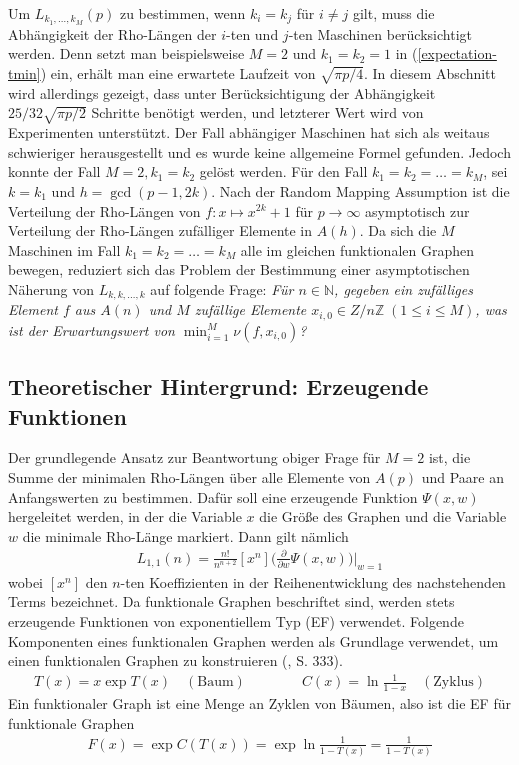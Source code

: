 \documentclass[a4paper, 10pt, ngerman]{article}
\newcommand{\N}{\mathbb{N}}
\newcommand{\Z}{\mathbb{Z}}
\begin{document}
Um $L_{k_1, \dots, k_M}(p)$ zu bestimmen, wenn $k_i = k_j$ für $i \ne j$ gilt, muss die Abhängigkeit der Rho-Längen der $i$-ten und $j$-ten Maschinen berücksichtigt werden. Denn setzt man beispielsweise $M = 2$ und $k_1 = k_2 = 1$ in (\ref{expectation-tmin}) ein, erhält man eine erwartete Laufzeit von $\sqrt {\pi p / 4}$. In diesem Abschnitt wird allerdings gezeigt, dass unter Berücksichtigung der Abhängigkeit $25/32 \sqrt{\pi p / 2}$ Schritte benötigt werden, und letzterer Wert wird von Experimenten unterstützt. Der Fall abhängiger Maschinen hat sich als weitaus schwieriger herausgestellt und es wurde keine allgemeine Formel gefunden. Jedoch konnte der Fall $M = 2, k_1 = k_2$ gelöst werden. Für den Fall $k_1 = k_2 = \dots = k_M$, sei $k = k_1$ und $h = \gcd(p - 1, 2k)$. Nach der Random Mapping Assumption ist die Verteilung der Rho-Längen von $f : x \mapsto x^{2k} + 1$ für $p \to \infty$ asymptotisch zur Verteilung der Rho-Längen zufälliger Elemente in $A(h)$. Da sich die $M$ Maschinen im Fall $k_1 = k_2 = \dots = k_M$ alle im gleichen funktionalen Graphen bewegen, reduziert sich das Problem der Bestimmung einer asymptotischen Näherung von $L_{k, k, \dots, k}$ auf folgende Frage: \emph{Für $n \in \N$, gegeben ein zufälliges Element $f$ aus $A(n)$ und $M$ zufällige Elemente $x_{i, 0} \in Z/n\Z \; (1 \le i \le M)$, was ist der Erwartungswert von $\min_{i = 1}^M \nu(f, x_{i, 0})$?}

\subsection{Theoretischer Hintergrund: Erzeugende Funktionen}

Der grundlegende Ansatz zur Beantwortung obiger Frage für $M = 2$ ist, die Summe der minimalen Rho-Längen über alle Elemente von $A(p)$ und Paare an Anfangswerten zu bestimmen. Dafür soll eine erzeugende Funktion $\Psi(x, w)$ hergeleitet werden, in der die Variable $x$ die Größe des Graphen und die Variable $w$ die minimale Rho-Länge markiert. Dann gilt nämlich
\begin{align*}
    L_{1, 1}(n) = \frac {n!}{n^{n + 2}} [x^n] \Bigg (\frac {\partial} {\partial w} \Psi(x, w) \Bigg ) \Bigg \vert_{w = 1}
\end{align*}
wobei $[x^n]$ den $n$-ten Koeffizienten in der Reihenentwicklung des nachstehenden Terms bezeichnet. Da funktionale Graphen beschriftet sind, werden stets erzeugende Funktionen von exponentiellem Typ (EF) verwendet. Folgende Komponenten eines funktionalen Graphen werden als Grundlage verwendet, um einen funktionalen Graphen zu konstruieren (\cite{fo90}, S. 333).
\begin{align*}
    T(x) = x \exp T(x) \quad (\text{Baum}) \qquad\qquad
    C(x) = \ln \frac {1} {1 - x} \quad (\text{Zyklus})
\end{align*}
Ein funktionaler Graph ist eine Menge an Zyklen von Bäumen, also ist die EF für funktionale Graphen
\begin{align*}
    F(x) = \exp C(T(x)) = \exp \ln \frac 1 {1 - T(x)} = \frac 1 {1 - T(x)}
\end{align*}
\end{document}
